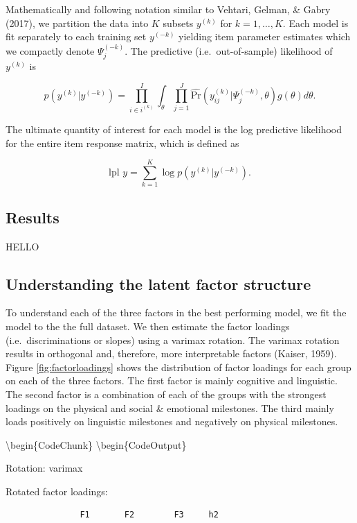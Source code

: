 \documentclass[10pt, letterpaper]{article}
\begin{document}
Mathematically and following notation similar to Vehtari, Gelman, \&
Gabry (2017), we partition the data into \(K\) subsets \(y^{(k)}\) for
\(k = 1, \ldots, K\). Each model is fit separately to each training set
\(y^{(-k)}\) yielding item parameter estimates which we compactly denote
\(\Psi_j^{(-k)}\). The predictive (i.e.~out-of-sample) likelihood of
\(y^{(k)}\) is

\[
p(y^{(k)} | y^{(-k)}) = \prod_{i \in i^{(k)}}^{I} \int_\theta \prod_{j=1}^{J} \hat{\text{Pr}}(y_{ij}^{(k)} | \Psi_j^{(-k)}, \theta) g(\theta)d\theta.
\]

The ultimate quantity of interest for each model is the log predictive
likelihood for the entire item response matrix, which is defined as

\[
\text{lpl } y = \sum_{k = 1}^{K} \log p(y^{(k)} | y^{(-k)}).
\]

\hypertarget{results}{%
\subsection{Results}\label{results}}

HELLO

\hypertarget{understanding-the-latent-factor-structure}{%
\subsection{Understanding the latent factor
structure}\label{understanding-the-latent-factor-structure}}

To understand each of the three factors in the best performing model, we
fit the model to the the full dataset. We then estimate the factor
loadings (i.e.~discriminations or slopes) using a varimax rotation. The
varimax rotation results in orthogonal and, therefore, more
interpretable factors (Kaiser, 1959). Figure \ref{fig:factorloadings}
shows the distribution of factor loadings for each group on each of the
three factors. The first factor is mainly cognitive and linguistic. The
second factor is a combination of each of the groups with the strongest
loadings on the physical and social \& emotional milestones. The third
mainly loads positively on linguistic milestones and negatively on
physical milestones.

\textbackslash begin\{CodeChunk\} \textbackslash begin\{CodeOutput\}

Rotation: varimax

Rotated factor loadings:

\begin{verbatim}
               F1       F2        F3     h2
\end{verbatim}
\end{document}
